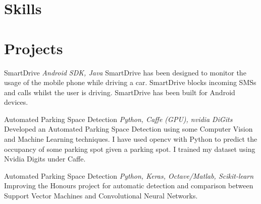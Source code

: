 \documentclass[letterpaper]{moderncv}        %
\begin{document}
\section{Skills}
\section{Projects}
\cventry
{}
{SmartDrive}
{}
{\textit{Android SDK, Java}}
{}
{SmartDrive has been designed to monitor the usage of the mobile phone while driving a car. SmartDrive blocks incoming SMSs and calls whilst the user is driving. SmartDrive has been built for Android devices.\\}

		\cventry
		{}
		{Automated Parking Space Detection}
		{}
		{\textit{Python, Caffe (GPU), nvidia DiGits}}
		{}
		{Developed an Automated Parking Space Detection using some Computer Vision and Machine Learning techniques. I have used opencv with Python to predict the occupancy of some parking spot given a parking spot. I trained my dataset using Nvidia Digits under Caffe.\\}

			\cventry
			{}
			{Automated Parking Space Detection}
			{}
			{\textit{Python, Keras, Octave/Matlab, Scikit-learn}}
			{}
			{Improving the Honours project for automatic detection and comparison between Support Vector Machines and Convolutional Neural Networks.\\}

				
\end{document}
